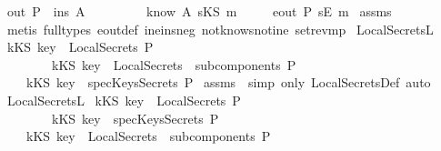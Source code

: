 \begin{isabellebody}
\ {\isachardoublequoteopen}out\ P\ {\isasymsubseteq}\ ins\ A{\isachardoublequoteclose}\isanewline
\ \ \ \ \ \ \ \ {\isachardoublequoteopen}{\isasymnot}\ know\ A\ {\isacharparenleft}sKS\ m{\isacharparenright}{\isachardoublequoteclose}\isanewline
{}\ \ \ \ {\isachardoublequoteopen}{\isasymnot}\ eout\ P\ {\isacharparenleft}sE\ m{\isacharparenright}{\isachardoublequoteclose}\isanewline
\isadelimproof
\endisadelimproof
\isatagproof
{}\isamarkupfalse \ assms\isanewline
{}\isamarkupfalse \ {\isacharparenleft}metis\ {\isacharparenleft}full{\isacharunderscore}types{\isacharparenright}\ eout{\isacharunderscore}def\ ine{\isacharunderscore}ins{\isacharunderscore}neg{}\ not{\isacharunderscore}know{\isacharunderscore}s{\isacharunderscore}not{\isacharunderscore}ine\ set{\isacharunderscore}rev{\isacharunderscore}mp{\isacharparenright}\endisatagproof
{\isafoldproof}\isadelimproof
\isanewline
\endisadelimproof
\isanewline
{}\isamarkupfalse \ LocalSecrets{\isacharunderscore}L{}{\isacharcolon}\isanewline
{}\ {\isachardoublequoteopen}{\isacharparenleft}kKS{\isacharparenright}\ key\ {\isasymin}\ LocalSecrets\ P{\isachardoublequoteclose}\ \ \isanewline
\ \ \ \ \ \ \ \ {\isachardoublequoteopen}{\isacharparenleft}kKS\ key{\isacharparenright}\ {\isasymnotin}\ {\isasymUnion}{\isacharparenleft}LocalSecrets\ {\isacharbackquote}\ subcomponents\ P{\isacharparenright}{\isachardoublequoteclose}\isanewline
{}\ \ \ \ {\isachardoublequoteopen}kKS\ key\ {\isasymnotin}\ specKeysSecrets\ P{\isachardoublequoteclose}\isanewline
\isadelimproof
\endisadelimproof
\isatagproof
{}\isamarkupfalse \ assms\ \isamarkupfalse \ {\isacharparenleft}simp\ only{\isacharcolon}\ LocalSecretsDef{\isacharcomma}\ auto{\isacharparenright}\endisatagproof
{\isafoldproof}\isadelimproof
\isanewline
\endisadelimproof
\isanewline
{}\isamarkupfalse \ LocalSecrets{\isacharunderscore}L{}{\isacharcolon}\isanewline
{}\ {\isachardoublequoteopen}kKS\ key\ {\isasymin}\ LocalSecrets\ P{\isachardoublequoteclose}\ \ \isanewline
\ \ \ \ \ \ \ \ {\isachardoublequoteopen}kKS\ key\ {\isasymin}\ specKeysSecrets\ P{\isachardoublequoteclose}\isanewline
{}\ \ \ \ {\isachardoublequoteopen}kKS\ key\ {\isasymin}\ {\isasymUnion}{\isacharparenleft}LocalSecrets\ {\isacharbackquote}\ subcomponents\ P{\isacharparenright}{\isachardoublequoteclose}\isanewline
\isadelimproof

\end{isabellebody}

